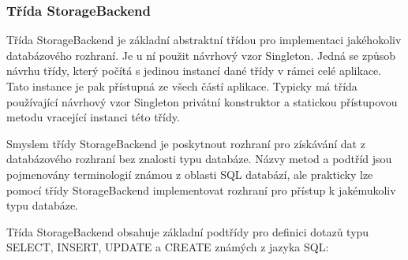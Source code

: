 \subsubsection{Třída StorageBackend}

Třída StorageBackend je základní abstraktní třídou pro implementaci jakéhokoliv databázového rozhraní.
Je u ní použit návrhový vzor Singleton. %
Jedná se způsob návrhu třídy, který počítá s jedinou instancí dané třídy v rámci celé aplikace.
Tato instance je pak přístupná ze všech částí aplikace. Typicky má třída používající návrhový
vzor Singleton privátní konstruktor a statickou přístupovou metodu vracející instanci této třídy.

Smyslem třídy StorageBackend je poskytnout rozhraní pro získávání dat z databázového rozhraní bez znalosti
typu databáze. Názvy metod a podtříd jsou pojmenovány terminologií známou z
oblasti SQL databází, %
 ale prakticky
lze pomocí třídy StorageBackend implementovat rozhraní pro přístup k jakémukoliv typu databáze.

Třída StorageBackend obsahuje základní podtřídy pro definici dotazů typu SELECT, INSERT, UPDATE a CREATE známých z
jazyka SQL:

